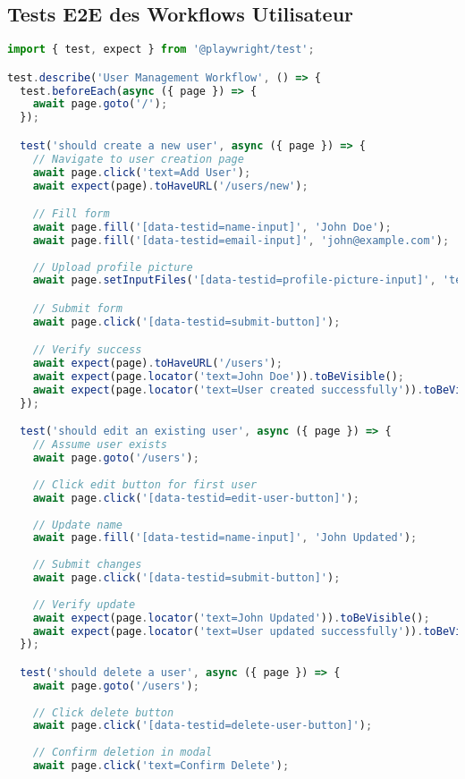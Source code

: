 \subsection{Tests E2E des Workflows Utilisateur}

\begin{lstlisting}[language=TypeScript, caption=Tests E2E]
import { test, expect } from '@playwright/test';

test.describe('User Management Workflow', () => {
  test.beforeEach(async ({ page }) => {
    await page.goto('/');
  });

  test('should create a new user', async ({ page }) => {
    // Navigate to user creation page
    await page.click('text=Add User');
    await expect(page).toHaveURL('/users/new');

    // Fill form
    await page.fill('[data-testid=name-input]', 'John Doe');
    await page.fill('[data-testid=email-input]', 'john@example.com');
    
    // Upload profile picture
    await page.setInputFiles('[data-testid=profile-picture-input]', 'test-files/profile.jpg');

    // Submit form
    await page.click('[data-testid=submit-button]');

    // Verify success
    await expect(page).toHaveURL('/users');
    await expect(page.locator('text=John Doe')).toBeVisible();
    await expect(page.locator('text=User created successfully')).toBeVisible();
  });

  test('should edit an existing user', async ({ page }) => {
    // Assume user exists
    await page.goto('/users');
    
    // Click edit button for first user
    await page.click('[data-testid=edit-user-button]');
    
    // Update name
    await page.fill('[data-testid=name-input]', 'John Updated');
    
    // Submit changes
    await page.click('[data-testid=submit-button]');
    
    // Verify update
    await expect(page.locator('text=John Updated')).toBeVisible();
    await expect(page.locator('text=User updated successfully')).toBeVisible();
  });

  test('should delete a user', async ({ page }) => {
    await page.goto('/users');
    
    // Click delete button
    await page.click('[data-testid=delete-user-button]');
    
    // Confirm deletion in modal
    await page.click('text=Confirm Delete');
    

\end{lstlisting}
